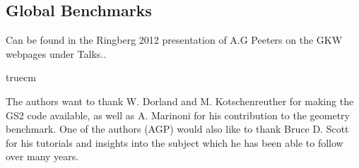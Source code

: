 \subsection{Global Benchmarks}

Can be found in the Ringberg 2012 presentation of A.G Peeters on the GKW webpages under Talks..


 truecm

 The authors want to thank W. Dorland and M. Kotschenreuther 
for making the GS2 code available, as well as A. Marinoni for his contribution to the geometry benchmark.
One of the authors (AGP) would also like to thank Bruce D. Scott for 
his tutorials and insights into the subject which he has been able to follow over many years.

